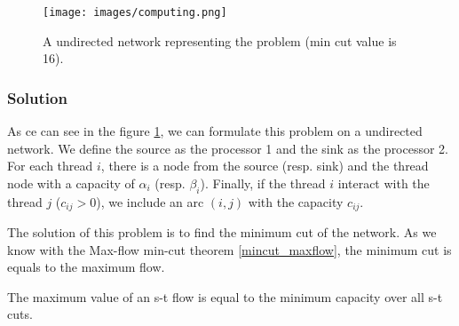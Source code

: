 \begin{figure}[H]
\centering
\texttt{[image: images/computing.png]}
\caption{A undirected network representing the problem (min cut value is 16).}
\label{img:computing}
\end{figure}

\subsubsection{Solution}

As ce can see in the figure \ref{img:computing}, we can formulate this problem on a undirected network. We define the source as the processor 1 and the sink as the processor 2. For each thread $i$, there is a node from the source (resp. sink) and the thread node with a capacity of $\alpha_i$ (resp. $\beta_i$). Finally, if the thread $i$ interact with the thread $j$ ($c_{ij} > 0$), we include an arc $(i, j)$ with the capacity $c_{ij}$.

The solution of this problem is to find the minimum cut of the network. As we know with the Max-flow min-cut theorem \ref{mincut_maxflow}, the minimum cut is equals to the maximum flow.

\begin{theorem}
\label{mincut_maxflow}
The maximum value of an s-t flow is equal to the minimum capacity over all s-t cuts.
\end{theorem}
